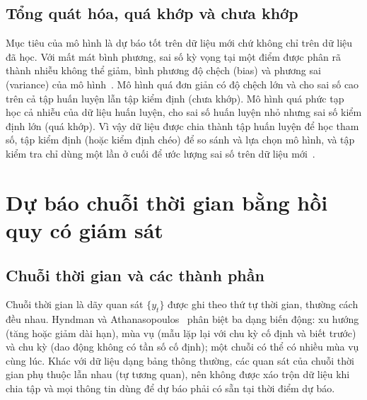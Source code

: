 \subsection{Tổng quát hóa, quá khớp và chưa khớp}
Mục tiêu của mô hình là dự báo tốt trên dữ liệu mới chứ không chỉ trên dữ liệu đã học. Với mất mát bình phương, sai số kỳ vọng tại một điểm được phân rã thành nhiễu không thể giảm, bình phương độ chệch (bias) và phương sai (variance) của mô hình~\cite[mục 7.3]{hastie2009elements}. Mô hình quá đơn giản có độ chệch lớn và cho sai số cao trên cả tập huấn luyện lẫn tập kiểm định (chưa khớp). Mô hình quá phức tạp học cả nhiễu của dữ liệu huấn luyện, cho sai số huấn luyện nhỏ nhưng sai số kiểm định lớn (quá khớp). Vì vậy dữ liệu được chia thành tập huấn luyện để học tham số, tập kiểm định (hoặc kiểm định chéo) để so sánh và lựa chọn mô hình, và tập kiểm tra chỉ dùng một lần ở cuối để ước lượng sai số trên dữ liệu mới~\cite{hastie2009elements}.

\section{Dự báo chuỗi thời gian bằng hồi quy có giám sát}
\label{sec:ts_theory}

\subsection{Chuỗi thời gian và các thành phần}
Chuỗi thời gian là dãy quan sát $\{y_t\}$ được ghi theo thứ tự thời gian, thường cách đều nhau. Hyndman và Athanasopoulos~\cite[mục 2.3]{hyndman2021fpp3} phân biệt ba dạng biến động: xu hướng (tăng hoặc giảm dài hạn), mùa vụ (mẫu lặp lại với chu kỳ cố định và biết trước) và chu kỳ (dao động không có tần số cố định); một chuỗi có thể có nhiều mùa vụ cùng lúc. Khác với dữ liệu dạng bảng thông thường, các quan sát của chuỗi thời gian phụ thuộc lẫn nhau (tự tương quan), nên không được xáo trộn dữ liệu khi chia tập và mọi thông tin dùng để dự báo phải có sẵn tại thời điểm dự báo.

